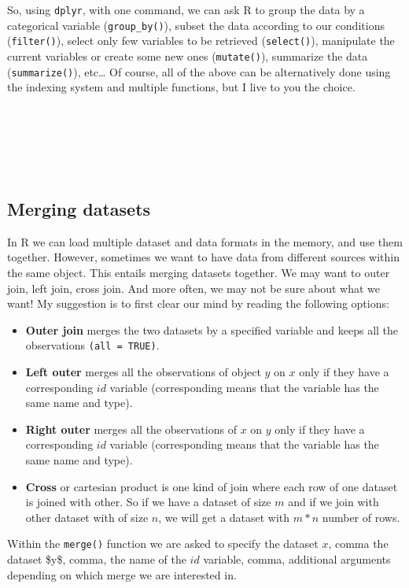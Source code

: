 \documentclass[
]{article}
\begin{document}
So, using \texttt{dplyr}, with one command, we can ask R to group the data by a
categorical variable (\texttt{group\_by()}), subset the data according to our
conditions (\texttt{filter()}), select only few variables to be retrieved
(\texttt{select()}), manipulate the current variables or create some new ones
(\texttt{mutate()}), summarize the data (\texttt{summarize()}), etc\ldots{} Of course, all
of the above can be alternatively done using the indexing system and
multiple functions, but I live to you the choice.

~

~

~

\hypertarget{merging-datasets}{%
\subsection{Merging datasets}\label{merging-datasets}}

In R we can load multiple dataset and data formats in the memory, and
use them together. However, sometimes we want to have data from
different sources within the same object. This entails merging datasets
together. We may want to outer join, left join, cross join. And more
often, we may not be sure about what we want! My suggestion is to first
clear our mind by reading the following options:

\begin{itemize}
\item
  \textbf{Outer join} merges the two datasets by a specified variable and
  keeps all the observations \texttt{(all\ =\ TRUE)}.
\item
  \textbf{Left outer} merges all the observations of object \(y\) on \(x\) only
  if they have a corresponding \(id\) variable (corresponding means that
  the variable has the same name and type).
\item
  \textbf{Right outer} merges all the observations of \(x\) on \(y\) only if
  they have a corresponding \(id\) variable (corresponding means that
  the variable has the same name and type).
\item
  \textbf{Cross} or cartesian product is one kind of join where each row of
  one dataset is joined with other. So if we have a dataset of size
  \(m\) and if we join with other dataset with of size \(n\), we will get
  a dataset with \(m*n\) number of rows.
\end{itemize}

Within the \texttt{merge()} function we are asked to specify the dataset \(x\),
comma the dataset \$y\$, comma, the name of the \(id\) variable, comma,
additional arguments depending on which merge we are interested in.
\end{document}
